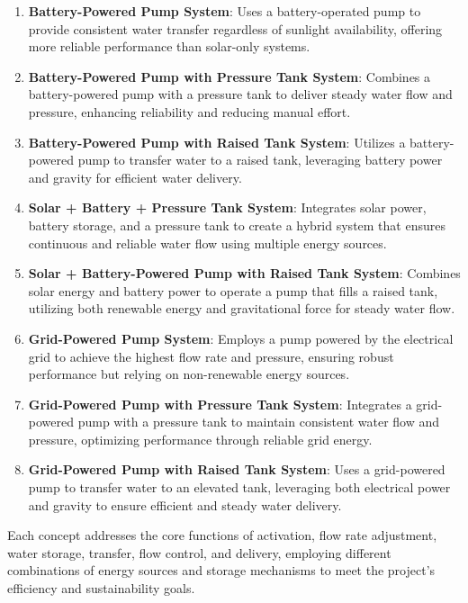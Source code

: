 \documentclass{article}
\begin{document}
\begin{enumerate}[label=\textbf{\arabic*.}]
    \item \textbf{Battery-Powered Pump System}: Uses a battery-operated pump to provide consistent water transfer regardless of sunlight availability, offering more reliable performance than solar-only systems.
    
    \item \textbf{Battery-Powered Pump with Pressure Tank System}: Combines a battery-powered pump with a pressure tank to deliver steady water flow and pressure, enhancing reliability and reducing manual effort.
    
    \item \textbf{Battery-Powered Pump with Raised Tank System}: Utilizes a battery-powered pump to transfer water to a raised tank, leveraging battery power and gravity for efficient water delivery.
    
    \item \textbf{Solar + Battery + Pressure Tank System}: Integrates solar power, battery storage, and a pressure tank to create a hybrid system that ensures continuous and reliable water flow using multiple energy sources.
    
    \item \textbf{Solar + Battery-Powered Pump with Raised Tank System}: Combines solar energy and battery power to operate a pump that fills a raised tank, utilizing both renewable energy and gravitational force for steady water flow.
    
    \item \textbf{Grid-Powered Pump System}: Employs a pump powered by the electrical grid to achieve the highest flow rate and pressure, ensuring robust performance but relying on non-renewable energy sources.
    
    \item \textbf{Grid-Powered Pump with Pressure Tank System}: Integrates a grid-powered pump with a pressure tank to maintain consistent water flow and pressure, optimizing performance through reliable grid energy.
    
    \item \textbf{Grid-Powered Pump with Raised Tank System}: Uses a grid-powered pump to transfer water to an elevated tank, leveraging both electrical power and gravity to ensure efficient and steady water delivery.
\end{enumerate}

\noindent Each concept addresses the core functions of activation, flow rate adjustment, water storage, transfer, flow control, and delivery, employing different combinations of energy sources and storage mechanisms to meet the project's efficiency and sustainability goals.
\end{document}
